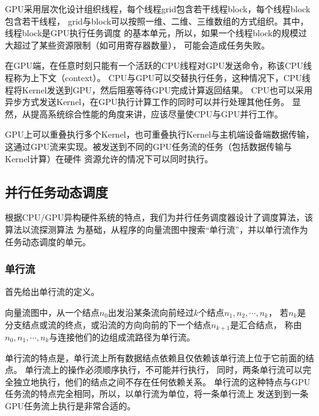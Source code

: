GPU采用层次化设计组织线程，每个线程grid包含若干线程block，每个线程block包含若干线程，
grid与block可以按照一维、二维、三维数组的方式组织。其中，线程block是GPU执行任务调度
的基本单元，所以，如果一个线程block的规模过大超过了某些资源限制（如可用寄存器数量），
可能会造成任务失败。

在GPU端，在任意时刻只能有一个活跃的CPU线程对GPU发送命令，称该CPU线程称为上下文（context）。
CPU与GPU可以交替执行任务，这种情况下，CPU线程将Kernel发送到GPU，然后阻塞等待GPU完成计算返回结果。
CPU也可以采用异步方式发送Kernel，在GPU执行计算工作的同时可以并行处理其他任务。
显然，从提高系统综合性能的角度来讲，应该尽量使CPU与GPU并行工作。

GPU上可以重叠执行多个Kernel，也可重叠执行Kernel与主机端设备端数据传输，
这通过GPU流来实现。被发送到不同的GPU任务流的任务（包括数据传输与Kernel计算）在硬件
资源允许的情况下可以同时执行。

\subsection{并行任务动态调度}\label{subsec:task-scheduling}
根据CPU/GPU异构硬件系统的特点，我们为并行任务调度器设计了调度算法，该算法以流探测算法
为基础，从程序的向量流图中搜索“单行流”，并以单行流作为任务动态调度的单元。

\subsubsection{单行流}
首先给出单行流的定义。
\begin{definition}
  向量流图中，从一个结点$n_0$出发沿某条流向前经过$k$个结点$n_1, n_2, \cdots, n_k$，
  若$n_k$是分支结点或流的终点，或沿流的方向向前的下一个结点$n_{k+1}$是汇合结点，
  称由$n_0, n_1, \cdots, n_k$与连接他们的边组成流路径为单行流。
\end{definition}

单行流的特点是，单行流上所有数据结点依赖且仅依赖该单行流上位于它前面的结点。
单行流上的操作必须顺序执行，不可能并行执行，
同时，两条单行流可以完全独立地执行，他们的结点之间不存在任何依赖关系。
单行流的这种特点与GPU任务流的特点完全相同，所以，以单行流为单位，将一条单行流上
发送到到一条GPU任务流上执行是非常合适的。

\begin{quotation}
\end{quotation}

